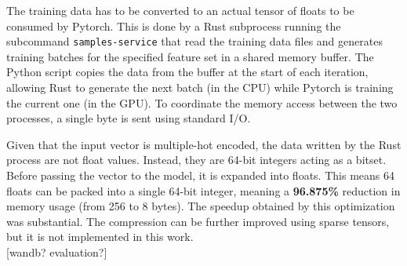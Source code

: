 The training data has to be converted to an actual tensor of floats to be consumed by Pytorch. This is done by a Rust subprocess running the subcommand \texttt{samples-service} that read the training data files and generates training batches for the specified feature set in a shared memory buffer. The Python script copies the data from the buffer at the start of each iteration, allowing Rust to generate the next batch (in the CPU) while Pytorch is training the current one (in the GPU). To coordinate the memory access between the two processes, a single byte is sent using standard I/O.

Given that the input vector is multiple-hot encoded, the data written by the Rust process are not float values. Instead, they are 64-bit integers acting as a bitset. Before passing the vector to the model, it is expanded into floats. This means 64 floats can be packed into a single 64-bit integer, meaning a \textbf{96.875\%} reduction in memory usage (from 256 to 8 bytes). The speedup obtained by this optimization was substantial. The compression can be further improved using sparse tensors, but it is not implemented in this work. \\

[wandb? evaluation?]
